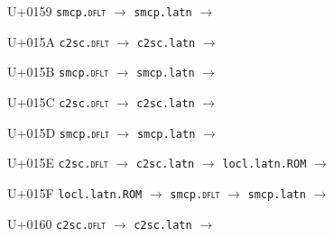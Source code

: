 \documentclass{article}
\begin{document}
\begin{substitutions}
\goodbreak

U+0159  \linebreak
    \texttt{smcp.\textsc{dflt}} $\to$  \linebreak
    \texttt{smcp.latn} $\to$  

\goodbreak

U+015A  \linebreak
    \texttt{c2sc.\textsc{dflt}} $\to$  \linebreak
    \texttt{c2sc.latn} $\to$  

\goodbreak

U+015B  \linebreak
    \texttt{smcp.\textsc{dflt}} $\to$  \linebreak
    \texttt{smcp.latn} $\to$  

\goodbreak

U+015C  \linebreak
    \texttt{c2sc.\textsc{dflt}} $\to$  \linebreak
    \texttt{c2sc.latn} $\to$  

\goodbreak

U+015D  \linebreak
    \texttt{smcp.\textsc{dflt}} $\to$  \linebreak
    \texttt{smcp.latn} $\to$  

\goodbreak

U+015E  \linebreak
    \texttt{c2sc.\textsc{dflt}} $\to$  \linebreak
    \texttt{c2sc.latn} $\to$  \linebreak
    \texttt{locl.latn.ROM} $\to$  

\goodbreak

U+015F  \linebreak
    \texttt{locl.latn.ROM} $\to$  \linebreak
    \texttt{smcp.\textsc{dflt}} $\to$  \linebreak
    \texttt{smcp.latn} $\to$  

\goodbreak

U+0160  \linebreak
    \texttt{c2sc.\textsc{dflt}} $\to$  \linebreak
    \texttt{c2sc.latn} $\to$  


\end{substitutions}
\end{document}
